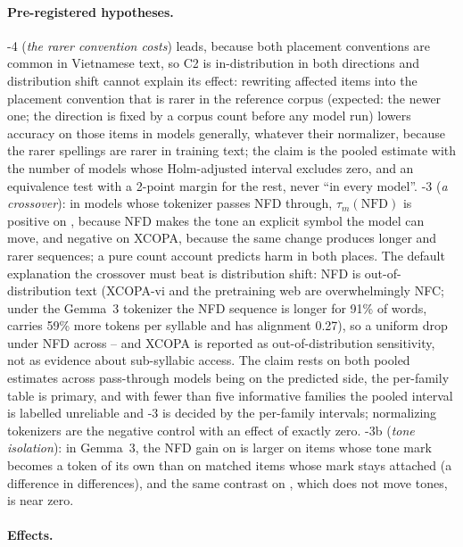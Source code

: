 \paragraph{Pre-registered hypotheses.}
\hyp{4} (\emph{the rarer convention costs}) leads, because both placement conventions are common in Vietnamese text, so C2 is in-distribution in both directions and distribution shift cannot explain its effect: rewriting affected items into the placement convention that is rarer in the reference corpus (expected: the newer one; the direction is fixed by a corpus count before any model run) lowers accuracy on those items in models generally, whatever their normalizer, because the rarer spellings are rarer in training text; the claim is the pooled estimate with the number of models whose Holm-adjusted interval excludes zero, and an equivalence test with a 2-point margin for the rest, never ``in every model''. \hyp{3} (\emph{a crossover}): in models whose tokenizer passes NFD through, $\tau_m(\mathrm{NFD})$ is positive on  , because NFD makes the tone an explicit symbol the model can move, and negative on XCOPA, because the same change produces longer and rarer sequences; a pure count account predicts harm in both places. The default explanation the crossover must beat is distribution shift: NFD is out-of-distribution text (XCOPA-vi and the pretraining web are overwhelmingly NFC; under the Gemma~3 tokenizer the NFD sequence is longer for 91\% of words, carries 59\% more tokens per syllable and has alignment 0.27), so a uniform drop under NFD across -- and XCOPA is reported as out-of-distribution sensitivity, not as evidence about sub-syllabic access. The claim rests on both pooled estimates across pass-through models being on the predicted side, the per-family table is primary, and with fewer than five informative families the pooled interval is labelled unreliable and \hyp{3} is decided by the per-family intervals; normalizing tokenizers are the negative control with an effect of exactly zero. \hyp{3b} (\emph{tone isolation}): in Gemma~3, the NFD gain on  is larger on items whose tone mark becomes a token of its own than on matched items whose mark stays attached (a difference in differences), and the same contrast on , which does not move tones, is near zero.

\paragraph{Effects.}
 

